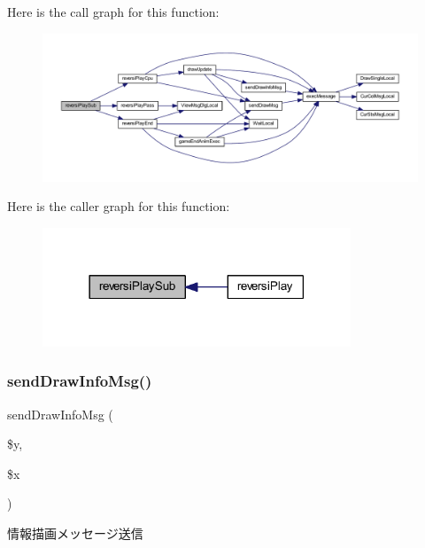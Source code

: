 Here is the call graph for this function\+:\nopagebreak
\begin{figure}[H]
\begin{center}
\leavevmode
\includegraphics[width=350pt]{class_reversi_play_a990fc6e45b7bdf2dab569f087f8b5a62_cgraph}
\end{center}
\end{figure}
Here is the caller graph for this function\+:\nopagebreak
\begin{figure}[H]
\begin{center}
\leavevmode
\includegraphics[width=261pt]{class_reversi_play_a990fc6e45b7bdf2dab569f087f8b5a62_icgraph}
\end{center}
\end{figure}
\mbox{\label{class_reversi_play_a829b61937e857a9f1b5b371be25dbabd}} 
\subsubsection{\texorpdfstring{send\+Draw\+Info\+Msg()}{sendDrawInfoMsg()}}
{\footnotesize\ttfamily send\+Draw\+Info\+Msg (\begin{DoxyParamCaption}\item[{}]{\$y,  }\item[{}]{\$x }\end{DoxyParamCaption})}



情報描画メッセージ送信 



